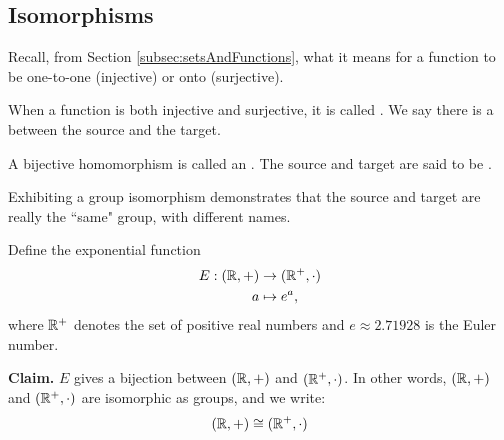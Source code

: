 \documentclass[../algebraNotesMSRI-UP2016.tex]{subfiles}
\begin{document}
\subsection[\subsecname]{Isomorphisms}\label{subsec:isomorphisms}
\begin{frame}{\subsecname}
Recall, from Section \ref{subsec:setsAndFunctions}, what it means for a function to be one-to-one (injective) or onto (surjective).

\smallGap
When a function is both injective and surjective, it is called .  We say there is a  between the source and the target.

\smallGap  
\begin{dfn}
A bijective homomorphism is called an .  The source and target are said to be .
\end{dfn}

\smallGap
Exhibiting a group isomorphism demonstrates that the source and target are really the ``same" group, with different names.
\end{frame}

\begin{frame}
\begin{ex}\label{ex:exponentialFunction}
Define the exponential function
\begin{align*}
E:(\mathbb R,+) &\to (\mathbb R^+,\cdot) \\
a &\mapsto e^a,
\end{align*}
where $\mathbb R^+$ denotes the set of positive real numbers and $e\approx 2.71928$ is the Euler number.  
\end{ex}
\smallGap
\textbf{Claim.} $E$ gives a bijection between $(\mathbb R,+)$ and $(\mathbb R^+,\cdot)$.  In other words, $(\mathbb R,+)$ and $(\mathbb R^+,\cdot)$ are isomorphic as groups, and we write: 
\[
(\mathbb R,+)\cong (\mathbb R^+,\cdot)
\]
\end{frame}
\end{document}
